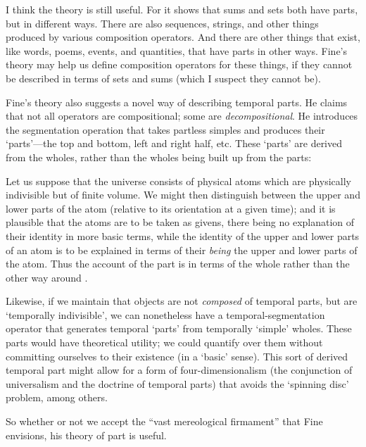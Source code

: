 \documentclass[11pt]{article}
\newenvironment{squote}{%
\begin{spacing}{1}
\begin{list}{}{%
\setlength{\labelwidth}{0pt}%
\rightmargin\leftmargin%
}
\item\relax
}{%
\end{list}%
\end{spacing}
}
\begin{document}
\begin{spacing}{1.5}
I think the theory is still useful.  For it shows that sums and sets
both have parts, but in different ways.  There are also sequences,
strings, and other things produced by various composition operators.
And there are other things that exist, like words, poems, events, and
quantities, that have parts in other ways.  Fine's theory may help us
define composition operators for these things, if they cannot be
described in terms of sets and sums (which I suspect they cannot be).

Fine's theory also suggests a novel way of describing temporal parts.
He claims that not all operators are compositional; some are {\em
  decompositional}.  He introduces the segmentation operation that
takes partless simples and produces their `parts'---the top and
bottom, left and right half, etc.  These `parts' are derived from the
wholes, rather than the wholes being built up from the parts:

\begin{squote}
Let us suppose that the universe consists of physical atoms which are
physically indivisible but of finite volume.  We might then
distinguish between the upper and lower parts of the atom (relative to
its orientation at a given time); and it is plausible that the atoms
are to be taken as givens, there being no explanation of their
identity in more basic terms, while the identity of the upper and
lower parts of an atom is to be explained in terms of their {\em
  being} the upper and lower parts of the atom.  Thus the account of
the part is in terms of the whole rather than the other way around
\citep[585]{fine2010}.
\end{squote}

Likewise, if we maintain that objects are not {\em composed} of
temporal parts, but are `temporally indivisible', we can nonetheless
have a temporal-segmentation operator that generates temporal `parts'
from temporally `simple' wholes.  These parts would have theoretical
utility; we could quantify over them without committing ourselves to
their existence (in a `basic' sense).  This sort of derived temporal
part might allow for a form of four-dimensionalism (the conjunction of
universalism and the doctrine of temporal parts) that avoids the
`spinning disc' problem, among others.

So whether or not we accept the ``vast mereological firmament'' that
Fine envisions, his theory of part is useful.


\end{spacing}
\end{document}
